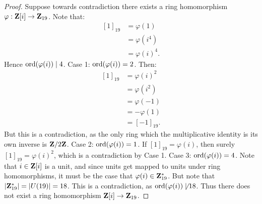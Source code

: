 \documentclass[10pt,twoside,openany]{memoir}
\begin{document}
    {\color{blue} \begin{proof}
        Suppose towards contradiction there exists a ring homomorphism $\varphi:\mathbf{Z}[i] \rightarrow \mathbf{Z}_{19}$. Note that:
            \begin{equation*}
            \begin{split}
                [1]_{19} 
                & = \varphi(1) \\
                & = \varphi(i^4) \\
                & = \varphi(i)^4.
            \end{split}
            \end{equation*}
        Hence $\operatorname{ord}(\varphi(i)) \mid 4$. Case 1: $\operatorname{ord}(\varphi(i)) = 2$. Then:
            \begin{equation*}
            \begin{split}
                [1]_{19} 
                & = \varphi(i)^2 \\
                & = \varphi(i^2) \\
                & = \varphi(-1) \\
                & = -\varphi(1) \\
                & = [-1]_{19}.
            \end{split}
            \end{equation*}
        But this is a contradiction, as the only ring which the multiplicative identity is its own inverse is $\mathbf{Z}/2\mathbf{Z}$. Case 2: $\operatorname{ord}(\varphi(i)) = 1$. If $[1]_{19} = \varphi(i)$, then surely $[1]_{19} = \varphi(i)^2$, which is a contradiction by Case 1. Case 3: $\operatorname{ord}(\varphi(i)) = 4$. Note that $i \in \mathbf{Z}[i]$ is a unit, and since units get mapped to units under ring homomorphisms, it must be the case that $\varphi(i) \in \mathbf{Z}_{19}^\ast$. But note that $|\mathbf{Z}_{19}^\ast| = |U(19)| = 18$. This is a contradiction, as $\operatorname{ord}(\varphi(i)) \not\mid 18$. Thus there does not exist a ring homomorphism $\mathbf{Z}[i] \rightarrow \mathbf{Z}_{19}$.


\end{proof}}
\end{document}
